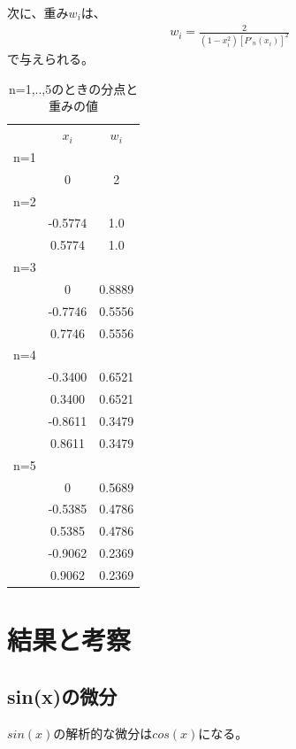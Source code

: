 \documentclass[dvipdfmx]{jsarticle}
\begin{document}
次に、重み$w_i$は、
\begin{eqnarray}
  w_i = \frac{2}{(1-x_i^2)[P'_n(x_i)]^2}
\end{eqnarray}
で与えられる。
\begin{table}[H]
  \begin{tabular}{ccc}
     & \emph{$x_i$} & \emph{$w_i$} \\
    n=1                            \\
     & 0            & 2            \\
    n=2                            \\
     & -0.5774      & 1.0          \\
     & 0.5774       & 1.0          \\
    n=3                            \\
     & 0            & 0.8889       \\
     & -0.7746      & 0.5556       \\
     & 0.7746       & 0.5556       \\
    n=4                            \\
     & -0.3400      & 0.6521       \\
     & 0.3400       & 0.6521       \\
     & -0.8611      & 0.3479       \\
     & 0.8611       & 0.3479       \\
    n=5                            \\
     & 0            & 0.5689       \\
     & -0.5385      & 0.4786       \\
     & 0.5385       & 0.4786       \\
     & -0.9062      & 0.2369       \\
     & 0.9062       & 0.2369
  \end{tabular}
  \centering
  \caption{n=1,..,5のときの分点と重みの値}
  \label{gauss_tbl1}
\end{table}

\section{結果と考察}

\subsection{sin(x)の微分}
$sin(x)$の解析的な微分は$cos(x)$になる。
\end{document}

